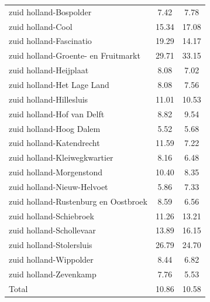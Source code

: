 \begin{longtable}{lcc}
zuid holland-Bospolder & 7.42 & 7.78 \\
zuid holland-Cool & 15.34 & 17.08 \\
zuid holland-Fascinatio & 19.29 & 14.17 \\
zuid holland-Groente- en Fruitmarkt & 29.71 & 33.15 \\
zuid holland-Heijplaat & 8.08 & 7.02 \\
zuid holland-Het Lage Land & 8.08 & 7.56 \\
zuid holland-Hillesluis & 11.01 & 10.53 \\
zuid holland-Hof van Delft & 8.82 & 9.54 \\
zuid holland-Hoog Dalem & 5.52 & 5.68 \\
zuid holland-Katendrecht & 11.59 & 7.22 \\
zuid holland-Kleiwegkwartier & 8.16 & 6.48 \\
zuid holland-Morgenstond & 10.40 & 8.35 \\
zuid holland-Nieuw-Helvoet & 5.86 & 7.33 \\
zuid holland-Rustenburg en Oostbroek & 8.59 & 6.56 \\
zuid holland-Schiebroek & 11.26 & 13.21 \\
zuid holland-Schollevaar & 13.89 & 16.15 \\
zuid holland-Stolersluis & 26.79 & 24.70 \\
zuid holland-Wippolder & 8.44 & 6.82 \\
zuid holland-Zevenkamp & 7.76 & 5.53 \\
Total & 10.86 & 10.58 \\
\hline
\end{longtable}
